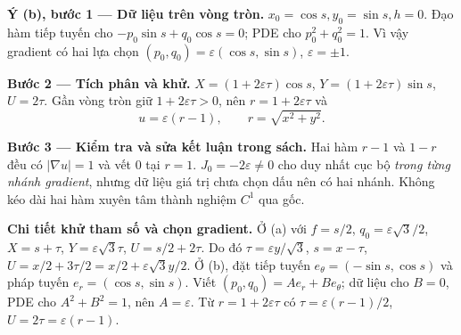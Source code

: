\documentclass[10pt,a4paper]{article}
\begin{document}
\textbf{Ý (b), bước 1 — Dữ liệu trên vòng tròn.} $x_0=\cos s,y_0=\sin s,h=0$. Đạo hàm tiếp tuyến cho $-p_0\sin s+q_0\cos s=0$; PDE cho $p_0^2+q_0^2=1$. Vì vậy gradient có hai lựa chọn $(p_0,q_0)=\varepsilon(\cos s,\sin s)$, $\varepsilon=\pm1$.

\textbf{Bước 2 — Tích phân và khử.} $X=(1+2\varepsilon\tau)\cos s$, $Y=(1+2\varepsilon\tau)\sin s$, $U=2\tau$. Gần vòng tròn giữ $1+2\varepsilon\tau>0$, nên $r=1+2\varepsilon\tau$ và
\[u=\varepsilon(r-1),\qquad r=\sqrt{x^2+y^2}.\]

\textbf{Bước 3 — Kiểm tra và sửa kết luận trong sách.} Hai hàm $r-1$ và $1-r$ đều có $|\nabla u|=1$ và vết 0 tại $r=1$. $J_0=-2\varepsilon\ne0$ cho duy nhất cục bộ \emph{trong từng nhánh gradient}, nhưng dữ liệu giá trị chưa chọn dấu nên có hai nhánh. Không kéo dài hai hàm xuyên tâm thành nghiệm $C^1$ qua gốc.

\textbf{Chi tiết khử tham số và chọn gradient.} Ở (a) với $f=s/2$, $q_0=\varepsilon\sqrt3/2$, $X=s+\tau$, $Y=\varepsilon\sqrt3\tau$, $U=s/2+2\tau$. Do đó $\tau=\varepsilon y/\sqrt3$, $s=x-\tau$, $U=x/2+3\tau/2=x/2+\varepsilon\sqrt3 y/2$. Ở (b), đặt tiếp tuyến $e_\theta=(-\sin s,\cos s)$ và pháp tuyến $e_r=(\cos s,\sin s)$. Viết $(p_0,q_0)=Ae_r+Be_\theta$; dữ liệu cho $B=0$, PDE cho $A^2+B^2=1$, nên $A=\varepsilon$. Từ $r=1+2\varepsilon\tau$ có $\tau=\varepsilon(r-1)/2$, $U=2\tau=\varepsilon(r-1)$.
\end{document}
